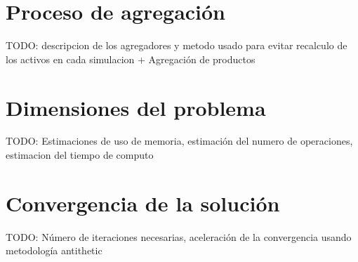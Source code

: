 \section{Proceso de agregaci\'on}

TODO: descripcion de los agregadores y metodo usado para evitar recalculo 
de los activos en cada simulacion + Agregaci\'on de productos


\section{Dimensiones del problema}

TODO: Estimaciones de uso de memoria, estimaci\'on del numero de operaciones,
estimacion del tiempo de computo


\section{Convergencia de la soluci\'on}

TODO: N\'umero de iteraciones necesarias, aceleraci\'on de la convergencia
usando metodolog\'ia antithetic

